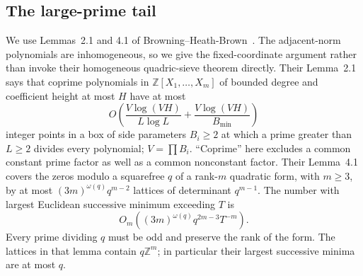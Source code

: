 \subsection{The large-prime tail}\label{subsec:v5-large-sieve}

We use Lemmas~2.1 and 4.1 of Browning--Heath-Brown~\cite{v5bhb}.
The adjacent-norm polynomials are inhomogeneous, so we give the
fixed-coordinate argument rather than invoke their homogeneous
quadric-sieve theorem directly.
Their Lemma~2.1 says that coprime polynomials in $\mathbb Z[X_1,\ldots,X_m]$
of bounded degree and coefficient height at most $H$ have at most
\begin{equation}\label{eq:v5-box-sieve}
 O\left(\frac{V\log(VH)}{L\log L}
           +\frac{V\log(VH)}{B_{\min}}\right)
\end{equation}
integer points in a box of side parameters $B_i\geq2$ at which a prime
greater than $L\geq2$ divides every polynomial; $V=\prod B_i$.
``Coprime'' here excludes a common constant prime factor as well as a
common nonconstant factor. Their Lemma~4.1 covers the zeros modulo a
squarefree $q$ of a rank-$m$ quadratic form, with $m\geq3$, by at most
$(3m)^{\omega(q)}q^{m-2}$ lattices of determinant $q^{m-1}$.
The number with largest Euclidean successive minimum exceeding $T$ is
\begin{equation}\label{eq:v5-lattice-tail}
 O_m((3m)^{\omega(q)}q^{2m-3}T^{-m}).
\end{equation}
Every prime dividing $q$ must be odd and preserve the rank of the form.
The lattices in that lemma contain $q\mathbb Z^m$; in particular their
largest successive minima are at most $q$.

